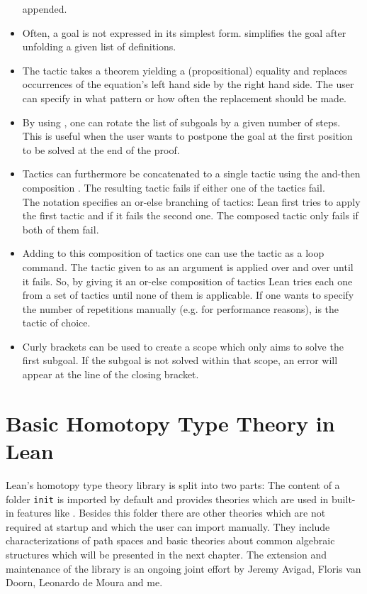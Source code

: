 \begin{itemize}
appended.
\item Often, a goal is not expressed in its simplest form.
 simplifies the goal after unfolding a given list of definitions.
\item The  tactic takes a theorem yielding a (propositional)
equality and replaces occurrences of the equation's left hand side by the 
right hand side.
The user can specify in what pattern or how often the replacement should be made.
\item By using , one can rotate the list of subgoals by a given
number of steps.
This is useful when the user wants to postpone the goal at the first position
to be solved at the end of the proof.
\item Tactics can furthermore be concatenated to a single tactic using the and-then
composition .
The resulting tactic fails if either one of the tactics fail. \\
The notation  specifies an or-else branching of tactics:
Lean first tries to apply the first tactic and if it fails the second one.
The composed tactic only fails if both of them fail.
\item Adding to this composition of tactics one can use the 
tactic as a loop command.
The tactic given to  as an argument is applied over and over until
it fails.
So, by giving it an or-else composition of tactics Lean tries each one from a set
of tactics until none of them is applicable.
If one wants to specify the number of repetitions manually (e.g. for performance
reasons),  is the tactic of choice.
\item Curly brackets can be used to create a scope which only aims to solve the
first subgoal.
If the subgoal is not solved within that scope, an error will appear at the line
of the closing bracket. %
\end{itemize} %

\section{Basic Homotopy Type Theory in Lean}

Lean's homotopy type theory library is split into two parts:
The content of a folder \texttt{init} is imported by default and provides
theories which are used in built-in features like .
Besides this folder there are other theories which are not required at startup
and which the user can import manually.
They include characterizations of path spaces and basic theories about common
algebraic structures which will be presented in the next chapter.
The extension and maintenance of the library is an ongoing joint effort by
Jeremy Avigad, Floris van Doorn, Leonardo de Moura and me.

